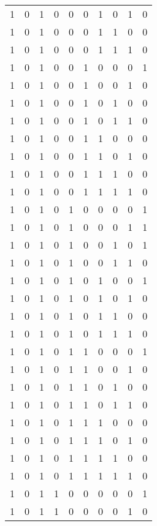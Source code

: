 \begin{longtable}[c]{rrrrrrrrrr}
        1 & 0 & 1 & 0 & 0 & 0 & 1 & 0 & 1 & 0 \\
        1 & 0 & 1 & 0 & 0 & 0 & 1 & 1 & 0 & 0 \\
        1 & 0 & 1 & 0 & 0 & 0 & 1 & 1 & 1 & 0 \\
        1 & 0 & 1 & 0 & 0 & 1 & 0 & 0 & 0 & 1 \\
        1 & 0 & 1 & 0 & 0 & 1 & 0 & 0 & 1 & 0 \\
        1 & 0 & 1 & 0 & 0 & 1 & 0 & 1 & 0 & 0 \\
        1 & 0 & 1 & 0 & 0 & 1 & 0 & 1 & 1 & 0 \\
        1 & 0 & 1 & 0 & 0 & 1 & 1 & 0 & 0 & 0 \\
        1 & 0 & 1 & 0 & 0 & 1 & 1 & 0 & 1 & 0 \\
        1 & 0 & 1 & 0 & 0 & 1 & 1 & 1 & 0 & 0 \\
        1 & 0 & 1 & 0 & 0 & 1 & 1 & 1 & 1 & 0 \\
        1 & 0 & 1 & 0 & 1 & 0 & 0 & 0 & 0 & 1 \\
        1 & 0 & 1 & 0 & 1 & 0 & 0 & 0 & 1 & 1 \\
        1 & 0 & 1 & 0 & 1 & 0 & 0 & 1 & 0 & 1 \\
        1 & 0 & 1 & 0 & 1 & 0 & 0 & 1 & 1 & 0 \\
        1 & 0 & 1 & 0 & 1 & 0 & 1 & 0 & 0 & 1 \\
        1 & 0 & 1 & 0 & 1 & 0 & 1 & 0 & 1 & 0 \\
        1 & 0 & 1 & 0 & 1 & 0 & 1 & 1 & 0 & 0 \\
        1 & 0 & 1 & 0 & 1 & 0 & 1 & 1 & 1 & 0 \\
        1 & 0 & 1 & 0 & 1 & 1 & 0 & 0 & 0 & 1 \\
        1 & 0 & 1 & 0 & 1 & 1 & 0 & 0 & 1 & 0 \\
        1 & 0 & 1 & 0 & 1 & 1 & 0 & 1 & 0 & 0 \\
        1 & 0 & 1 & 0 & 1 & 1 & 0 & 1 & 1 & 0 \\
        1 & 0 & 1 & 0 & 1 & 1 & 1 & 0 & 0 & 0 \\
        1 & 0 & 1 & 0 & 1 & 1 & 1 & 0 & 1 & 0 \\
        1 & 0 & 1 & 0 & 1 & 1 & 1 & 1 & 0 & 0 \\
        1 & 0 & 1 & 0 & 1 & 1 & 1 & 1 & 1 & 0 \\
        1 & 0 & 1 & 1 & 0 & 0 & 0 & 0 & 0 & 1 \\
        1 & 0 & 1 & 1 & 0 & 0 & 0 & 0 & 1 & 0 \\

\end{longtable}
